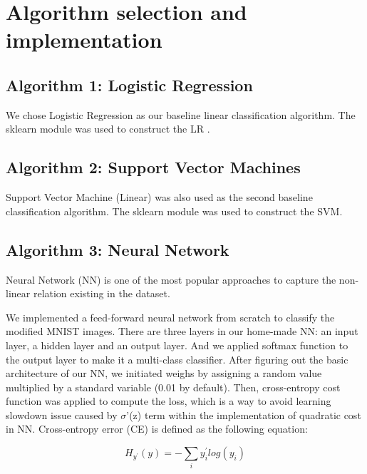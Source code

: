 \documentclass[10pt,conference]{IEEEtran}
\begin{document}

\section{Algorithm selection and implementation}

\subsection{Algorithm 1: Logistic Regression}
We chose Logistic Regression as our baseline linear classification algorithm. The sklearn module was used to construct the LR \cite{pedregosa2011scikit}. 

\subsection{Algorithm 2: Support Vector Machines}
Support Vector Machine (Linear) was also used as the second baseline classification algorithm. The sklearn module was used to construct the SVM\cite{pedregosa2011scikit}. 

\subsection{Algorithm 3: Neural Network}
Neural Network (NN) is one of the most popular approaches to capture the non-linear relation existing in the dataset. 

We implemented a feed-forward neural network from scratch to classify the modified MNIST images. There are three layers in our home-made NN: an input layer, a hidden layer and an output layer. And we applied softmax function to the output layer to make it a multi-class classifier. After figuring out the basic architecture of our NN, we initiated weighs by assigning a random value multiplied by a standard variable (0.01 by default). Then, cross-entropy cost function  was applied to compute the loss, which is a way to avoid learning slowdown issue caused by  $\sigma$'(z) term within the implementation of quadratic cost in NN. Cross-entropy error (CE) is defined as the following equation:

\begin{equation}\label{eq1}
H_{y^{'}}(y)=-\sum_{i}y_{i}^{'}log(y_{i})
\end{equation}
\end{document}
